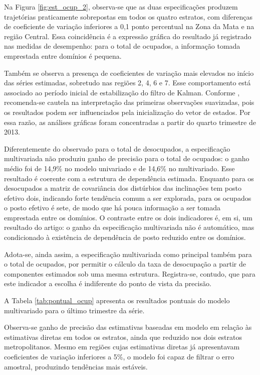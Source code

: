 \documentclass[rbe,wwwview]{econbr}
\begin{document}
Na Figura \ref{fig:est_ocup_2}, observa-se que as duas especificações produzem trajetórias praticamente sobrepostas em todos os quatro estratos, com diferenças de coeficiente de variação inferiores a 0,1 ponto percentual na Zona da Mata e na região Central. Essa coincidência é a expressão gráfica do resultado já registrado nas medidas de desempenho: para o total de ocupados, a informação tomada emprestada entre domínios é pequena.

Também se observa a presença de coeficientes de variação mais elevados no início das séries estimadas, sobretudo nas regiões 2, 4, 6 e 7. Esse comportamento está associado ao período inicial de estabilização do filtro de Kalman. Conforme \citet{durbinkoop2012}, recomenda-se cautela na interpretação das primeiras observações suavizadas, pois os resultados podem ser influenciados pela inicialização do vetor de estados. Por essa razão, as análises gráficas foram concentradas a partir do quarto trimestre de 2013.

Diferentemente do observado para o total de desocupados, a especificação multivariada não produziu ganho de precisão para o total de ocupados: o ganho médio foi de 14,9\% no modelo univariado e de 14,6\% no multivariado. Esse resultado é coerente com a estrutura de dependência estimada. Enquanto para os desocupados a matriz de covariância dos distúrbios das inclinações tem posto efetivo dois, indicando forte tendência comum a ser explorada, para os ocupados o posto efetivo é sete, de modo que há pouca informação a ser tomada emprestada entre os domínios. O contraste entre os dois indicadores é, em si, um resultado do artigo: o ganho da especificação multivariada não é automático, mas condicionado à existência de dependência de posto reduzido entre os domínios.

Adota-se, ainda assim, a especificação multivariada como principal também para o total de ocupados, por permitir o cálculo da taxa de desocupação a partir de componentes estimados sob uma mesma estrutura. Registra-se, contudo, que para este indicador a escolha é indiferente do ponto de vista da precisão.

A Tabela \ref{tab:pontual_ocup} apresenta os resultados pontuais do modelo multivariado para o último trimestre da série.

\vspace{-0.2cm}

\vspace{-0.3cm}

Observa-se ganho de precisão das estimativas baseadas em modelo em relação às estimativas diretas em todos os estratos, ainda que reduzido nos dois estratos metropolitanos. Mesmo em regiões cujas estimativas diretas já apresentavam coeficientes de variação inferiores a 5\%, o modelo foi capaz de filtrar o erro amostral, produzindo tendências mais estáveis.
\end{document}

